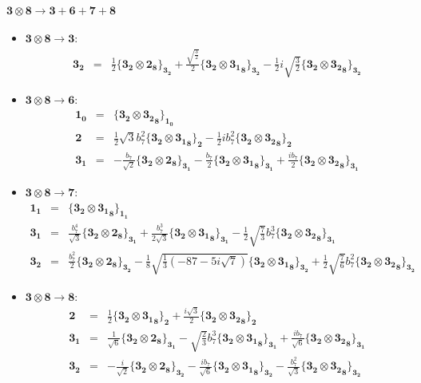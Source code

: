 \documentclass[english]{article}
\newcommand{\subcg}[3]{\big\{ {#1}\otimes{#2}\big\}^{}_{#3}}
\newcommand{\rep}[1]{\mathbf{#1}}
\begin{document}
\paragraph*{\Large $\rep{3}\otimes\rep{8}\to\rep{3}+\rep{6}+\rep{7}+\rep{8}$}
\begin{itemize}
\item $\rep{3}\otimes\rep{8}\to\rep{3}$:
\begin{eqnarray*}
\rep{3_2} &=& \frac{1}{2}\subcg{\rep{3_2}}{\rep{2}_{\rep{8}}}{\rep{3_2}}+\frac{\sqrt{\frac{3}{2}}}{2}\subcg{\rep{3_2}}{\rep{3_1}_{\rep{8}}}{\rep{3_2}}-\frac{1}{2} i \sqrt{\frac{3}{2}}\subcg{\rep{3_2}}{\rep{3_2}_{\rep{8}}}{\rep{3_2}}
\end{eqnarray*}
\item $\rep{3}\otimes\rep{8}\to\rep{6}$:
\begin{eqnarray*}
\rep{1_0} &=& \subcg{\rep{3_2}}{\rep{3_2}_{\rep{8}}}{\rep{1_0}}
\\
\rep{2} &=& \frac{1}{2} \sqrt{3} b_7^2\subcg{\rep{3_2}}{\rep{3_1}_{\rep{8}}}{\rep{2}}-\frac{1}{2} i b_7^2\subcg{\rep{3_2}}{\rep{3_2}_{\rep{8}}}{\rep{2}}
\\
\rep{3_1} &=& -\frac{b_7}{\sqrt{2}}\subcg{\rep{3_2}}{\rep{2}_{\rep{8}}}{\rep{3_1}}-\frac{b_7}{2}\subcg{\rep{3_2}}{\rep{3_1}_{\rep{8}}}{\rep{3_1}}+\frac{i b_7}{2}\subcg{\rep{3_2}}{\rep{3_2}_{\rep{8}}}{\rep{3_1}}
\end{eqnarray*}
\item $\rep{3}\otimes\rep{8}\to\rep{7}$:
\begin{eqnarray*}
\rep{1_1} &=& \subcg{\rep{3_2}}{\rep{3_1}_{\rep{8}}}{\rep{1_1}}
\\
\rep{3_1} &=& \frac{b_7^4}{\sqrt{3}}\subcg{\rep{3_2}}{\rep{2}_{\rep{8}}}{\rep{3_1}}+\frac{b_7^3}{2 \sqrt{3}}\subcg{\rep{3_2}}{\rep{3_1}_{\rep{8}}}{\rep{3_1}}-\frac{1}{2} \sqrt{\frac{7}{3}} b_7^3\subcg{\rep{3_2}}{\rep{3_2}_{\rep{8}}}{\rep{3_1}}
\\
\rep{3_2} &=& \frac{b_7^2}{2}\subcg{\rep{3_2}}{\rep{2}_{\rep{8}}}{\rep{3_2}}-\frac{1}{8} \sqrt{\frac{1}{3} \left(-87-5 i \sqrt{7}\right)}\subcg{\rep{3_2}}{\rep{3_1}_{\rep{8}}}{\rep{3_2}}+\frac{1}{2} \sqrt{\frac{7}{6}} b_7^2\subcg{\rep{3_2}}{\rep{3_2}_{\rep{8}}}{\rep{3_2}}
\end{eqnarray*}
\item $\rep{3}\otimes\rep{8}\to\rep{8}$:
\begin{eqnarray*}
\rep{2} &=& \frac{1}{2}\subcg{\rep{3_2}}{\rep{3_1}_{\rep{8}}}{\rep{2}}+\frac{i \sqrt{3}}{2}\subcg{\rep{3_2}}{\rep{3_2}_{\rep{8}}}{\rep{2}}
\\
\rep{3_1} &=& \frac{1}{\sqrt{6}}\subcg{\rep{3_2}}{\rep{2}_{\rep{8}}}{\rep{3_1}}-\sqrt{\frac{2}{3}} b_7^3\subcg{\rep{3_2}}{\rep{3_1}_{\rep{8}}}{\rep{3_1}}+\frac{i b_7}{\sqrt{6}}\subcg{\rep{3_2}}{\rep{3_2}_{\rep{8}}}{\rep{3_1}}
\\
\rep{3_2} &=& -\frac{i}{\sqrt{2}}\subcg{\rep{3_2}}{\rep{2}_{\rep{8}}}{\rep{3_2}}-\frac{i b_7}{\sqrt{6}}\subcg{\rep{3_2}}{\rep{3_1}_{\rep{8}}}{\rep{3_2}}-\frac{b_7^2}{\sqrt{3}}\subcg{\rep{3_2}}{\rep{3_2}_{\rep{8}}}{\rep{3_2}}
\end{eqnarray*}
\end{itemize}
\end{document}
